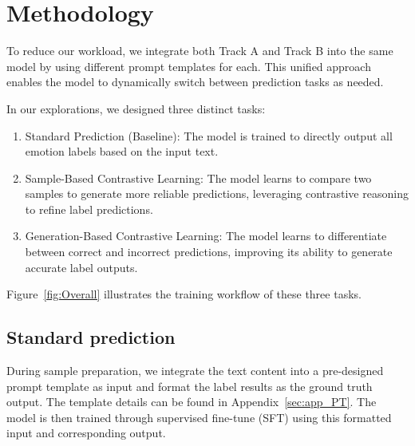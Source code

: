 \documentclass[11pt]{article}
\begin{document}
\section{Methodology}


To reduce our workload, we integrate both Track A and Track B into the same model by using different prompt templates for each. This unified approach enables the model to dynamically switch between prediction tasks as needed. 

In our explorations, we designed three distinct tasks:
\begin{enumerate}
	\item Standard Prediction (Baseline): The model is trained to directly output all emotion labels based on the input text.
	\item Sample-Based Contrastive Learning: The model learns to compare two samples to generate more reliable predictions, leveraging contrastive reasoning to refine label predictions.
	\item Generation-Based Contrastive Learning: The model learns to differentiate between correct and incorrect predictions, improving its ability to generate accurate label outputs.
\end{enumerate}

Figure~\ref{fig:Overall} illustrates the training workflow of these three tasks.

\subsection{Standard prediction}
\label{sec:SP}

During sample preparation, we integrate the text content into a pre-designed prompt template as input and format the label results as the ground truth output. The template details can be found in Appendix~\ref{sec:app_PT}. The model is then trained through supervised fine-tune (SFT) using this formatted input and corresponding output.
\end{document}
